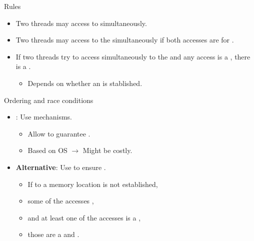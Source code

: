 \begin{frame}[t]{Rules}
\begin{itemize}
  \item Two threads may access to  
        simultaneously.

  \item Two threads may access to the 
        simultaneously if both accesses are for .

  \item If two threads try to access simultaneously to the  
        and any access is a , there is a 
        .
    \begin{itemize}
      \item Depends on whether an  is stablished.
    \end{itemize}
\end{itemize}
\end{frame}

\begin{frame}[t]{Ordering and race conditions}
\begin{itemize}
  \item {}: Use  mechanisms.
    \begin{itemize}
      \item Allow to guarantee .
      \item Based on OS $\rightarrow$ Might be costly.
    \end{itemize}

  \item \textbf{Alternative}: Use  to ensure 
        .
 
    \begin{itemize}
      \item If  to a memory location is not established,
      \item some of the accesses , 
      \item and at least one of the accesses is a , 
      \item those are a  and  
        .
    \end{itemize}
\end{itemize}
\end{frame}

